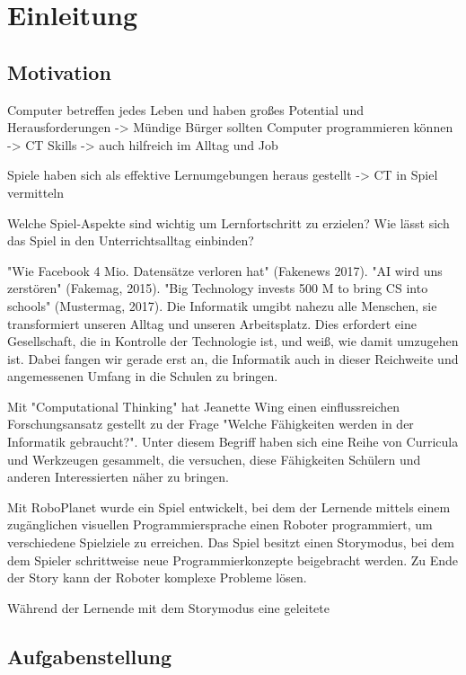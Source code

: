 \chapter{Einleitung}

\section{Motivation}

Computer betreffen jedes Leben und haben großes Potential und Herausforderungen -> Mündige Bürger
sollten Computer programmieren können -> CT Skills -> auch hilfreich im Alltag und Job

Spiele haben sich als effektive Lernumgebungen heraus gestellt -> CT in Spiel vermitteln


Welche Spiel-Aspekte sind wichtig um Lernfortschritt zu erzielen? Wie lässt sich das Spiel in
den Unterrichtsalltag einbinden?


"Wie Facebook 4 Mio. Datensätze verloren hat" (Fakenews 2017). "AI wird uns zerstören" (Fakemag,
2015). "Big Technology invests 500 M to bring CS into schools" (Mustermag, 2017). Die Informatik
umgibt nahezu alle Menschen, sie transformiert unseren Alltag und unseren Arbeitsplatz. Dies
erfordert eine Gesellschaft, die in Kontrolle der Technologie ist, und weiß, wie damit umzugehen
ist. Dabei fangen wir gerade erst an, die Informatik auch in dieser Reichweite und angemessenen
Umfang in die Schulen zu bringen.

Mit "Computational Thinking" hat Jeanette Wing einen einflussreichen Forschungsansatz gestellt zu
der Frage "Welche Fähigkeiten werden in der Informatik gebraucht?". Unter diesem Begriff haben sich
eine Reihe von Curricula und Werkzeugen gesammelt, die versuchen, diese Fähigkeiten Schülern und
anderen Interessierten näher zu bringen.

Mit RoboPlanet wurde ein Spiel entwickelt, bei dem der Lernende mittels einem zugänglichen visuellen
Programmiersprache einen Roboter programmiert, um verschiedene Spielziele zu erreichen. Das Spiel
besitzt einen Storymodus, bei dem dem Spieler schrittweise neue Programmierkonzepte beigebracht
werden. Zu Ende der Story kann der Roboter komplexe Probleme lösen.

Während der Lernende mit dem Storymodus eine geleitete

\section{Aufgabenstellung}

